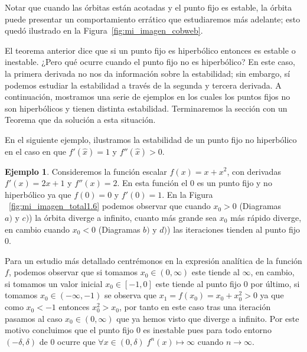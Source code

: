\documentclass[12pt,a4paper]{report}
\theoremstyle{definition}
\newtheorem{ejemplo}{Ejemplo}[section]
\begin{document}
Notar que cuando las órbitas están acotadas y el punto fijo es estable, la órbita puede presentar un comportamiento errático que estudiaremos más adelante; esto quedó ilustrado en la Figura~\ref{fig:mi_imagen_cobweb}.

El teorema anterior dice que si un punto fijo es hiperbólico entonces es estable o inestable.
¿Pero qué ocurre cuando el punto fijo no es hiperbólico? En este caso, la primera derivada no nos da información sobre la estabilidad; sin embargo, sí podemos estudiar la estabilidad a través de la segunda y tercera derivada. A continuación, mostramos una serie de ejemplos en los cuales los puntos fijos no son hiperbólicos y tienen distinta estabilidad. Terminaremos la sección con un Teorema que da solución a esta situación.

En el siguiente ejemplo, ilustramos la estabilidad de un punto fijo no hiperbólico en el caso en que \( f'(\hat{x}) = 1 \) y \( f''(\hat{x}) > 0 \).

\begin{ejemplo}

Consideremos la función escalar $f(x) = x + x^2 $, con derivadas $f'(x) = 2  x + 1$ y $f''(x) = 2$. En esta función el $0$  es un punto fijo y no hiperbólico ya que $f(0) = 0 $ y $f'(0) = 1$. En la Figura ~\ref{fig:mi_imagen_total1.6} podemos observar que cuando $x_0 > 0$ (Diagramas $a) \text{  y  } c)$)  la órbita diverge a infinito, cuanto más grande sea $x_0$ más rápido diverge, en cambio cuando $x_0 < 0$ (Diagramas $b) \text{ y } d)$) las iteraciones tienden al punto fijo $0$.

Para un estudio más detallado centrémonos en la expresión analítica de la función $f$, podemos observar que si tomamos $x_0 \in (0, \infty)$ este tiende al $\infty$, en cambio, si tomamos un valor inicial $x_0 \in [-1,0]$ este tiende al punto fijo $0$ por último, si tomamos $x_0 \in (-\infty, -1)$ se observa que $x_1 
 = f(x_0) = x_0 + x_0^2 > 0$ ya que como $x_0 < -1$ entonces $x_0^2 > x_0$, por tanto en este caso tras una iteración pasamos al caso $x_0 \in (0,\infty)$ que ya hemos visto que diverge a infinito. Por este motivo concluimos que el punto fijo $0$ es inestable pues para todo entorno $(-\delta,\delta)$ de $0$  ocurre que $\forall x \in (0, \delta) \; f^n(x) \mapsto \infty$ cuando $n \to \infty$. 
    
\end{ejemplo}
\end{document}
